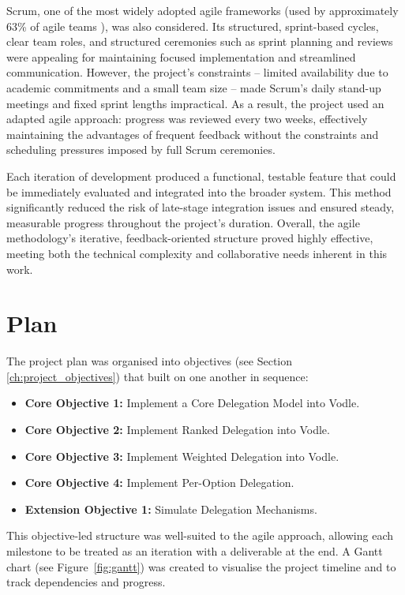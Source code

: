 Scrum, one of the most widely adopted agile frameworks (used by approximately 63\% of agile teams \citep{versionone2020stateofagile}), was also considered. Its structured, sprint-based cycles, clear team roles, and structured ceremonies such as sprint planning and reviews were appealing for maintaining focused implementation and streamlined communication. However, the project's constraints -- limited availability due to academic commitments and a small team size -- made Scrum's daily stand-up meetings and fixed sprint lengths impractical. As a result, the project used an adapted agile approach: progress was reviewed every two weeks, effectively maintaining the advantages of frequent feedback without the constraints and scheduling pressures imposed by full Scrum ceremonies.

Each iteration of development produced a functional, testable feature that could be immediately evaluated and integrated into the broader system. This method significantly reduced the risk of late-stage integration issues and ensured steady, measurable progress throughout the project's duration. Overall, the agile methodology's iterative, feedback-oriented structure proved highly effective, meeting both the technical complexity and collaborative needs inherent in this work.
\section{Plan}

The project plan was organised into objectives (see Section \ref{ch:project_objectives}) that built on one another in sequence:

\begin{itemize}
    \item \textbf{Core Objective 1:} Implement a Core Delegation Model into Vodle.
    \item \textbf{Core Objective 2:} Implement Ranked Delegation into Vodle.
    \item \textbf{Core Objective 3:} Implement Weighted Delegation into Vodle.
    \item \textbf{Core Objective 4:} Implement Per-Option Delegation.
    \item \textbf{Extension Objective 1:} Simulate Delegation Mechanisms.
\end{itemize}

This objective-led structure was well-suited to the agile approach, allowing each milestone to be treated as an iteration with a deliverable at the end. A Gantt chart (see Figure~\ref{fig:gantt}) was created to visualise the project timeline and to track dependencies and progress.

